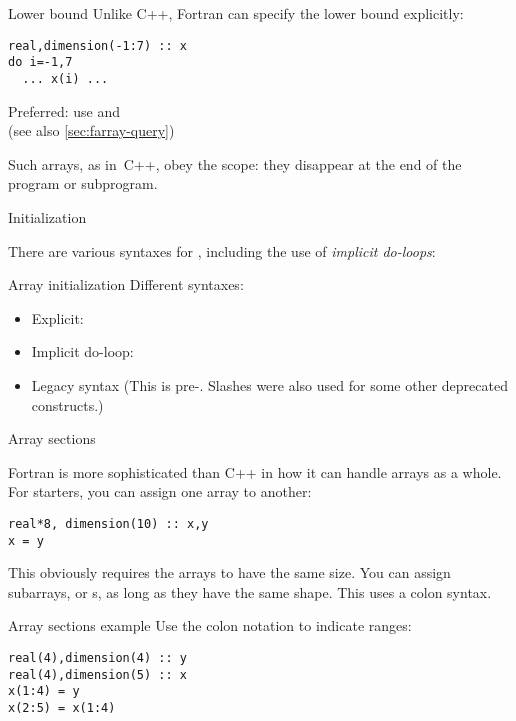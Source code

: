 \begin{block}{Lower bound}
  \label{sl:farray-lower}
Unlike C++, Fortran can specify the lower bound explicitly:
\begin{lstlisting}
real,dimension(-1:7) :: x
do i=-1,7
  ... x(i) ...
\end{lstlisting}

Preferred: use  and \\
(see also \ref{sec:farray-query})
\end{block}

Such arrays, as in~C++, obey the scope: they disappear at the end of
the program or subprogram.

 {Initialization}

There are various syntaxes for ,
including the use of
\emph{implicit do-loops}:
%
\begin{block}{Array initialization}
  \label{sl:farray-init}
  Different syntaxes:
  \begin{itemize}
  \item Explicit:
  \item Implicit do-loop:
  \item Legacy syntax
    (This is pre-. Slashes were also used for some other deprecated constructs.)
  \end{itemize}
\end{block}

 {Array sections}

Fortran is more sophisticated than C++ in how it can handle arrays as
a whole. For starters, you can assign one array to another:

\begin{lstlisting}
real*8, dimension(10) :: x,y
x = y
\end{lstlisting}

This obviously requires the arrays to have the same size.
You can assign subarrays,
or s,
as long as they have the same shape. This uses a colon syntax.

\begin{slide}{Array sections example}
  \label{sl:farray-section}
  Use the colon notation to indicate ranges:
\begin{lstlisting}
real(4),dimension(4) :: y
real(4),dimension(5) :: x
x(1:4) = y
x(2:5) = x(1:4)
\end{lstlisting}
\end{slide}

